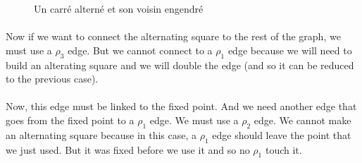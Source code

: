\begin{figure}[H]
  \begin{center}
    \caption{Un carré alterné et son voisin engendré}
  \end{center}
\end{figure}

\paragraph{}
Now if we want to connect the alternating square to the rest of the graph, we must use a $\rho_3$ edge. But we cannot connect to a $\rho_1$ edge because we will need to build an alterating square and we will double the edge (and so it can be reduced to the previous case).

\paragraph{}
Now, this edge must be linked to the fixed point. And we need another edge that goes from the fixed point to a $\rho_1$ edge. We must use a $\rho_2$ edge. We cannot make an alternating square because in this case, a $\rho_1$ edge should leave the point that we just used. But it was fixed before we use it and so no $\rho_1$ touch it.

